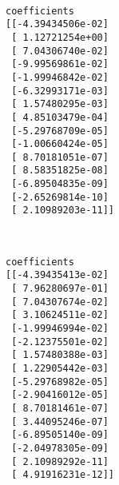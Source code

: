 \documentclass[11pt]{article}
\begin{document}
    \begin{center}
    \end{center}
    { \hspace*{\fill} \\}
    
    \begin{Verbatim}[commandchars=\\\{\}]
coefficients
[[-4.39434506e-02]
 [ 1.12721254e+00]
 [ 7.04306740e-02]
 [-9.99569861e-02]
 [-1.99946842e-02]
 [-6.32993171e-03]
 [ 1.57480295e-03]
 [ 4.85103479e-04]
 [-5.29768709e-05]
 [-1.00660424e-05]
 [ 8.70181051e-07]
 [ 8.58351825e-08]
 [-6.89504835e-09]
 [-2.65269814e-10]
 [ 2.10989203e-11]]

    \end{Verbatim}

    \begin{center}
    \end{center}
    { \hspace*{\fill} \\}
    
    \begin{Verbatim}[commandchars=\\\{\}]
coefficients
[[-4.39435413e-02]
 [ 7.96280697e-01]
 [ 7.04307674e-02]
 [ 3.10624511e-02]
 [-1.99946994e-02]
 [-2.12375501e-02]
 [ 1.57480388e-03]
 [ 1.22905442e-03]
 [-5.29768982e-05]
 [-2.90416012e-05]
 [ 8.70181461e-07]
 [ 3.44095246e-07]
 [-6.89505140e-09]
 [-2.04978305e-09]
 [ 2.10989292e-11]
 [ 4.91916231e-12]]

    \end{Verbatim}


    
    
    
    
\end{document}
